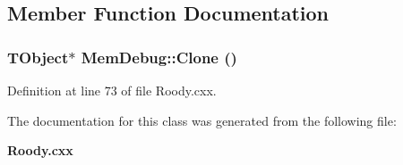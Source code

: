 \subsection{Member Function Documentation}
\subsubsection[{Clone}]{\setlength{\rightskip}{0pt plus 5cm}TObject$\ast$ MemDebug::Clone ()\hspace{0.3cm}{\ttfamily  [inline]}}\label{classMemDebug_a393888af02ddd6f540992ea8f1bc9c00}


Definition at line 73 of file Roody.cxx.

The documentation for this class was generated from the following file:\begin{DoxyCompactItemize}
\item 
{\bf Roody.cxx}\end{DoxyCompactItemize}
